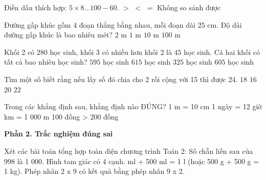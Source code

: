 \begin{ex} %
Điền dấu thích hợp: $5 \times 8 \dots 100 - 60$.
\choice
{$>$}
{$<$}
{\True $=$}
{Không so sánh được}
\end{ex}

\begin{ex} %
Đường gấp khúc gồm 4 đoạn thẳng bằng nhau, mỗi đoạn dài 25 cm. Độ dài đường gấp khúc là bao nhiêu mét?
\choice
{$2\text{ m}$}
{\True $1\text{ m}$}
{$10\text{ m}$}
{$100\text{ m}$}
\end{ex}

\begin{ex} %
Khối 2 có $280$ học sinh, khối 3 có nhiều hơn khối 2 là $45$ học sinh. Cả hai khối có tất cả bao nhiêu học sinh?
\choice
{$595$ học sinh}
{$615$ học sinh}
{$325$ học sinh}
{\True $605$ học sinh}
\end{ex}

\begin{ex} %
Tìm một số biết rằng nếu lấy số đó chia cho 2 rồi cộng với 15 thì được 24.
\choice
{\True $18$}
{$16$}
{$20$}
{$22$}
\end{ex}

\begin{ex} %
Trong các khẳng định sau, khẳng định nào ĐÚNG?
\choice
{1 m = 10 cm}
{1 ngày = 12 giờ}
{ km = 1 000 m}
{100 đồng > 200 đồng}
\end{ex}

\textbf{Phần 2. Trắc nghiệm đúng sai}

\begin{ex} %
Xét các bài toán tổng hợp toàn diện chương trình Toán 2:
\choiceTF
{\True Số chẵn liền sau của 998 là 1 000.}
{Hình tam giác có 4 cạnh.}
{ ml + 500 ml = 1 l (hoặc 500 g + 500 g = 1 kg).}
{\True Phép nhân 2 x 9 có kết quả bằng phép nhân 9 x 2.}
\end{ex}


